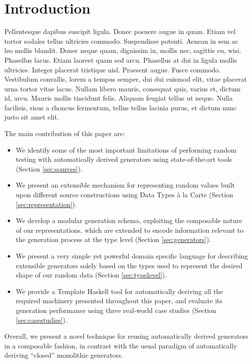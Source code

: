 \section{Introduction}
\label{sec:intro}

Pellentesque dapibus suscipit ligula. Donec posuere augue in quam. Etiam vel
tortor sodales tellus ultricies commodo. Suspendisse potenti. Aenean in sem ac
leo mollis blandit. Donec neque quam, dignissim in, mollis nec, sagittis eu,
wisi. Phasellus lacus. Etiam laoreet quam sed arcu. Phasellus at dui in ligula
mollis ultricies. Integer placerat tristique nisl. Praesent augue. Fusce
commodo. Vestibulum convallis, lorem a tempus semper, dui dui euismod elit,
vitae placerat urna tortor vitae lacus. Nullam libero mauris, consequat quis,
varius et, dictum id, arcu. Mauris mollis tincidunt felis. Aliquam feugiat
tellus ut neque. Nulla facilisis, risus a rhoncus fermentum, tellus tellus
lacinia purus, et dictum nunc justo sit amet elit.



The main contribution of this paper are:
%
\begin{itemize}
\item We identify some of the most important limitations of performing random
  testing with automatically derived generators using state-of-the-art tools
  (Section \ref{sec:sources}).
\item We present an extensible mechanism for representing random values built
  upon different source constructions using Data Types \`a la Carte (Section
  \ref{sec:representation}).
\item We develop a modular generation schema, exploiting the composable nature
  of our representations, which are extended to encode information relevant to
  the generation process at the type level (Section \ref{sec:generators}).
\item We present a very simple yet powerful domain specific language for
  describing extensible generators solely based on the types used to represent
  the desired shape of our random data (Section \ref{sec:typelevel}).
\item We provide a Template Haskell tool for automatically deriving all the
  required machinery presented throughout this paper, and evaluate its
  generation performance using three real-world case studies (Section
  \ref{sec:casestudies}).
\end{itemize}

Overall, we present a novel technique for reusing automatically derived
generators in a composable fashion, in contrast with the usual paradigm of
automatically deriving ``closed'' monolithic generators.